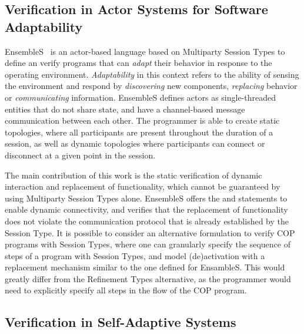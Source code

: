 \subsection{Verification in Actor Systems for Software Adaptability}
\label{sec:verification-actors}

EnsembleS~\cite{harvey21} is an actor-based language based on Multiparty Session Types to 
define an verify programs that can \emph{adapt} their behavior in response to the operating 
environment. \emph{Adaptability} in this context refers to the ability of sensing the environment and 
respond by \emph{discovering} new components, \emph{replacing} behavior or \emph{communicating} 
information. EnsembleS defines actors as single-threaded entities that do not share state, and have a 
channel-based message communication between each other. The programmer is able to create static 
topologies, where all participants are present throughout the duration of a session, as well as dynamic 
topologies where participants can connect or disconnect at a given point in the session.

The main contribution of this work is the static verification of dynamic interaction and replacement of 
functionality, which cannot be guaranteed by using Multiparty Session Types alone. EnsembleS offers 
the  and  statements to enable dynamic connectivity,  and verifies that the 
replacement of functionality does not violate the communication protocol that is already established by 
the Session Type. 
It is possible to consider an alternative formulation to verify \ac{COP} programs with Session Types, 
where one can granularly specify the sequence of steps of a program with Session Types, and model 
(de)activation with a replacement mechanism similar to the one defined for EnsambleS. This would 
greatly differ from the Refinement Types alternative, as the programmer would need to explicitly 
specify all steps in the flow of the \ac{COP} program.


\subsection{Verification in Self-Adaptive Systems}
\label{sec:verification-as}

